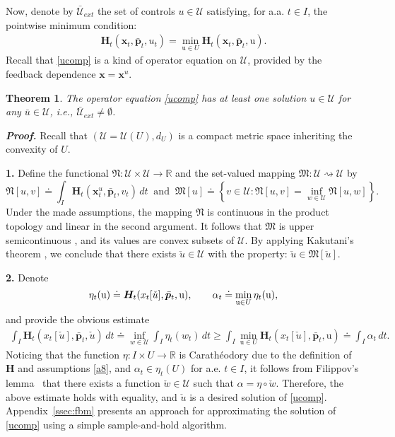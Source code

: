 \documentclass[sn-mathphys-num]{sn-jnl}
\numberwithin{equation}{section}
\theoremstyle{mythm}
\newtheorem{theorem}[proposition]{Theorem}
\theoremstyle{mydef}
\renewenvironment{proof}{\smallskip\noindent\emph{\textbf{Proof.}}%
  \hspace{1pt}}{\hspace{-5pt}{\nobreak\quad\nobreak\hfill\nobreak%
    $\square$\vspace{2pt}\par}\smallskip\goodbreak}
\renewcommand{\d}{\,d}
\newcommand{\R}{\mathbb{R}}
\begin{document}
Now, denote by $\bar{\mathcal U}_{ext}$ the set of controls $u\in \mathcal U$ satisfying, for a.a. $t \in I$, the pointwise minimum condition:
\begin{align}
     \bm H_t(\bm x_t,  \bar{\bm p}_t, u_t)= \min_{\mathrm{u}\in U} \bm H_t(\bm x_t,  \bar{\bm p}_t,\mathrm u).\label{ucomp}
\end{align}
Recall that \eqref{ucomp} is a kind of operator equation on $\mathcal U$, provided by the feedback dependence $\bm x = \bm x^u$. %
\begin{theorem}\label{thm:comp}  
The operator equation \eqref{ucomp} has at least one solution $u \in {\mathcal U}$ for any $\bar u \in \mathcal U$, i.e., \(\bar{\mathcal U}_{ext}\neq \emptyset\).
\end{theorem}
\begin{proof}
Recall that $(\mathcal U =\mathcal U(U), d_U)$ is a compact metric space inheriting the convexity of $U$. 

\textbf{1.} Define the functional $\mathfrak N\colon {\mathcal U}\times {\mathcal U}\to \R$ and the set-valued mapping $\mathfrak M \colon {\mathcal U} \rightsquigarrow {\mathcal U}$ by %
\[
   \mathfrak N[u,v] \doteq \displaystyle\int_{I}\bm H_t(\bm x_t^{u},  \bar{\bm p}_t, v_t)\,dt \ \text{ and } \ \mathfrak M[u] \doteq  \left\{v\in {\mathcal U}\colon \mathfrak N[u, v]=\inf_{w\in \mathcal U} \mathfrak N[u, w]\right\}.
\]
Under the made assumptions, the mapping $\mathfrak N$ is continuous in the product topology and linear in the second argument. It follows that $\mathfrak M$ is upper semicontinuous \cite[Theorem~6, p.~53]{aubin1984differential}, and its values are convex subsets of $\mathcal U$. By applying Kakutani's theorem \cite[Corollary~1, p.~85]{aubin1984differential}, we conclude that there exists $\check u \in \mathcal U$ with the property: $\check u\in \mathfrak M[\check u]$. 

\textbf{2.} Denote \[\eta_t(\mathrm{u}) \doteq \bm H_t(x_t[\check u], \bar{\bm p}_t, \mathrm{u}),\qquad \alpha_t \doteq \displaystyle\min_{{\rm u} \in U}\eta_t(\mathrm u),
\]
and provide the obvious estimate
\begin{align*}
    \int_{I} \bm H_t(x_t[\check u], \bar{\bm p}_t, \check {u})\,dt 
    \doteq 
    \inf_{w\in \mathcal U}\int_I \eta_t(w_t) \d t 
    \geq \int_{I}\min_{\mathrm{u} \in U} \bm H_t(x_t[\check u], \bar{\bm p}_t, \mathrm{u}) \doteq \int_{I} \alpha_t \d t.\label{proof-aux}
 \end{align*}
Noticing that the function \( \eta \colon I \times U \to \R\) is Carath\'{e}odory due to the definition of $\bm H$ and assumptions \ref{a8}, and \( \alpha_t\in  \eta_t(U) \) for a.e. \( t \in I \), it follows from Filippov's lemma~\cite[Theorem 8.2.10]{Aubin2009} that there exists a function $\check w \in \mathcal U$ such that \(\alpha = \eta \circ \check w\). Therefore, the above estimate holds with equality, and $\check u$ is a desired solution of \eqref{ucomp}.
\end{proof}
Appendix~\ref{ssec:fbm} presents an approach for approximating the solution of \eqref{ucomp} using a simple sample-and-hold algorithm.
\end{document}

